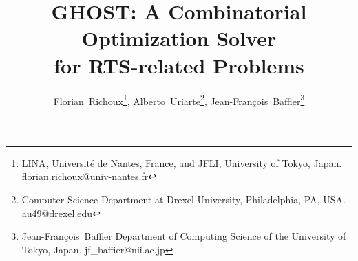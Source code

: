\documentclass{article}
\newcommand{\ghost}{\textsc{GHOST}\xspace}
\begin{document}


%
\title{\ghost: A Combinatorial Optimization Solver\\for RTS-related Problems}
%
%
%


\author{Florian~Richoux\thanks{LINA, Universit{\'e} de Nantes, France,
    and JFLI, University of Tokyo, Japan. florian.richoux@univ-nantes.fr},
        Alberto~Uriarte\thanks{Computer Science Department at Drexel University, Philadelphia, PA,
          USA. au49@drexel.edu},
        Jean-Fran{\c  c}ois~Baffier\thanks{Jean-Fran{\c  c}ois~Baffier
          Department of Computing Science of the University of Tokyo,
          Japan. jf\_baffier@nii.ac.jp}}
\date{}
\end{document}
